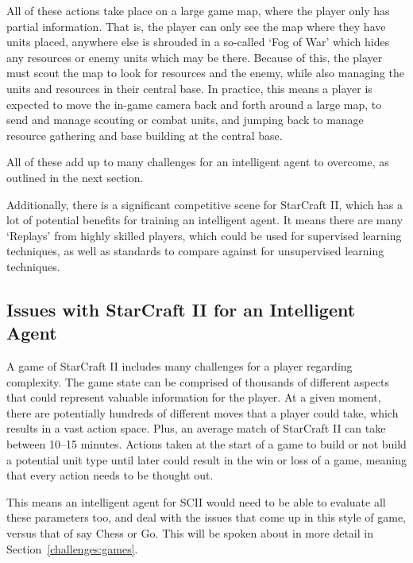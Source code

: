 All of these actions take place on a large game map, where the player only has
partial information. That is, the player can only see the map where they have
units placed, anywhere else is shrouded in a so-called `Fog of War' which hides
any resources or enemy units which may be there.
Because of this, the player must scout the map to look for resources and the
enemy, while also managing the units and resources in their central base.
In practice, this means a player is expected to move the in-game camera back
and forth around a large map, to send and manage scouting or combat units,
and jumping back to manage resource gathering and base building at the central
base.

All of these add up to many challenges for an intelligent agent to
overcome, as outlined in the next section.

Additionally, there is a significant competitive scene for StarCraft
II\cite{scIIprof}, which has a lot of potential benefits for training an
intelligent agent. It means there are many `Replays' from highly
skilled players, which could be used for supervised learning techniques, as well
as standards to compare against for unsupervised learning techniques.

\subsection{Issues with StarCraft II for an Intelligent Agent}

A game of StarCraft II includes many challenges for a player regarding
complexity. The game state can be comprised of thousands of different aspects
that could represent valuable information for the player. At a given moment,
there are potentially hundreds of different moves that a player could take,
which results in a vast action space. Plus, an average match of StarCraft II
can take between 10--15 minutes. Actions taken at the start of a game to build
or not build a potential unit type until later could result in the win or loss
of a game, meaning that every action needs to be thought out.

This means an intelligent agent for SCII would need to be able to evaluate all
these parameters too, and deal with the issues that come up in this style of
game, versus that of say Chess or Go. This will be spoken about in more detail
in Section~\ref{challenges:games}.


